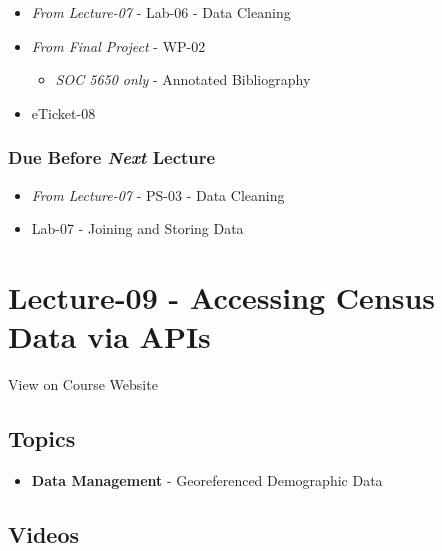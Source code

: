 \documentclass[
]{book}
\providecommand{\tightlist}{%
  \setlength{\itemsep}{0pt}\setlength{\parskip}{0pt}}
\begin{document}
\begin{itemize}
\tightlist
\item
  \emph{From Lecture-07} - Lab-06 - Data Cleaning
\item
  \emph{From Final Project} - WP-02

  \begin{itemize}
  \tightlist
  \item
    \emph{SOC 5650 only} - Annotated Bibliography
  \end{itemize}
\item
  eTicket-08
\end{itemize}

\hypertarget{due-before-next-lecture-6}{%
\subsubsection*{\texorpdfstring{Due Before \emph{Next} Lecture}{Due Before Next Lecture}}\label{due-before-next-lecture-6}}

\begin{itemize}
\tightlist
\item
  \emph{From Lecture-07} - PS-03 - Data Cleaning
\item
  Lab-07 - Joining and Storing Data
\end{itemize}

\hypertarget{lecture-09---accessing-census-data-via-apis}{%
\section*{Lecture-09 - Accessing Census Data via APIs}\label{lecture-09---accessing-census-data-via-apis}}

View on Course Website

\hypertarget{topics-9}{%
\subsection*{Topics}\label{topics-9}}

\begin{itemize}
\tightlist
\item
  \textbf{Data Management} - Georeferenced Demographic Data
\end{itemize}

\hypertarget{videos-1}{%
\subsection*{Videos}\label{videos-1}}
\end{document}
